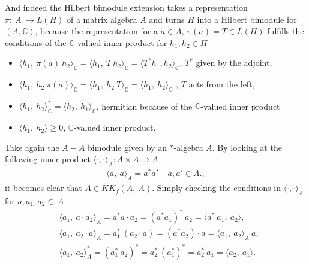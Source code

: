 And indeed the Hilbert bimodule extension takes a representation $\pi:\ A \
\rightarrow L(H)$ of a matrix algebra $A$ and turns $H$ into a Hilbert bimodule for
$(A, \mathbb{C})$, because the representation for a $a \in A$, $\pi(a)=T \in L(H)$ fulfills
the conditions of the $\mathbb{C}$-valued inner product for $h_1, h_2 \in H$
\begin{itemize}
    \item $\langle h_1,\ \pi(a)\ h_2\rangle _\mathbb{C} = \langle h_1,\ T\ h_2\rangle _\mathbb{C} =
        \langle T^* h_1, h_2\rangle _\mathbb{C}$, $T^*$ given by the adjoint,
    \item $\langle h_1,\ h_2\ \pi(a)\rangle _\mathbb{C} = \langle h_1,\ h_2\
        T\rangle _\mathbb{C} = \langle h_1,\ h_2\rangle _\mathbb{C}$ , $T$ acts
        from the left,
    \item $\langle h_1,\ h_2\rangle _\mathbb{C}^* = \langle h_2,\ h_1\rangle _\mathbb{C}$, hermitian because of the
        $\mathbb{C}$-valued inner product
    \item $\langle h_1,\ h_2\rangle  \ge 0$, $\mathbb{C}$-valued inner product.
\end{itemize}

Take again the $A-A$ bimodule given by an $*$-algebra $A$. By looking at the
following inner product $\langle \cdot,\cdot\rangle_A:A \times A \rightarrow A$
\begin{align}
    \langle a,\ a\rangle_A = a^*a' \;\;\;\; a,a'\in A.
    \label{eq:inner-product},
\end{align}
it becomes clear that $A \in KK_f(A,\ A)$.
Simply checking the conditions in $\langle \cdot, \cdot\rangle _A$ for
$a, a_1, a_2 \in~A$
\begin{align}
    &\langle a_1,\ a\cdot a_2\rangle _A = a^* a\cdot a_2 =
        (a^*a_1)^*\ a_2 = \langle  a^*\ a_1,\ a_2\rangle, \\
   &\langle a_1,\ a_2 \cdot a\rangle _A = a^*_1\ (a_2\cdot a) =
    (a^*a_2)\cdot a = \langle a_1,\ a_2\rangle _A\ a,\\
   &\langle a_1,\ a_2\rangle _A^* = (a_1^*\ a_2)^* = a_2^*\
        (a_1^*)^* = a_2^*\ a_1 = \langle a_2,\ a_1\rangle.
\end{align}




